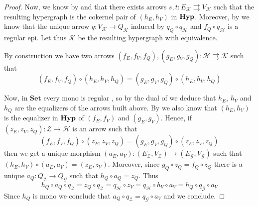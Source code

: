 \documentclass[3p]{elsarticle}
\newcommand{\Set}{\mathbf{Set}}
\newcommand{\catname}[1]{\textbf{\textup{#1}}}
\newcommand{\hyp}{\catname{Hyp}}
\theoremstyle{remark}
\theoremstyle{definition}
\begin{document}
\begin{proof}
	Now, we know by  and  that there exists arrows $s,t\colon E_{\mathcal{K}}\rightrightarrows V_{\mathcal{K}}$ such that the resulting hypergraph is the cokernel pair of $(h_E, h_V)$ in $\hyp$. Moreover, by  we know that the unique arrow $q\colon V_{\mathcal{K}}\to Q_{\mathcal{K}}$
	induced by $q_{Q}\circ q_{\mathcal{H}}$ and $f_{Q}\circ q_{\mathcal{H}}$ is a regular epi. Let thus $\mathcal{K}$ be the resulting hypergraph with equivalence.
	
	
	By construction we have two arrows 	$(f_E, f_V, f_Q), (g_E, g_V, g_Q): \mathcal{H\rightrightarrows K}$ such that 
	\[(f_E, f_V, f_Q)\circ (h_E, h_V, h_Q) =(g_E, g_V, g_Q)\circ (h_E, h_V, h_Q)\]
	
	Now, in $\Set$ every mono is regular \cite{maclane2012sheaves}, so by the dual of  we deduce that $h_E$, $h_V$ and $h_Q$ are the equalizers of the arrows built above. By  we also know that $(h_E, h_V)$ is the equalizer in $\hyp$ of $(f_E, f_V)$ and $(g_E, g_V)$.  Hence, if $(z_E, z_V, z_Q)\colon \mathcal{Z}\to \mathcal{H}$ is an arrow such that 
			\[(f_E, f_V, f_Q)\circ (z_E, z_V, z_Q) =(g_E, g_V, g_Q)\circ (z_E, z_V, z_Q)\]
	then we get a unique morphism $(a_E, a_V)\colon (E_{\mathcal{Z}}, V_{\mathcal{Z}})\to (E_{\mathcal{G}}, V_{\mathcal{G}})$ such that $(h_E, h_V)\circ (a_E, a_V) =(z_E, z_V)$. Moreover, since $g_Q\circ z_Q=f_Q\circ z_Q$ there is a unique $a_Q\colon Q_{\mathcal{Z}}\to Q_\mathcal{G}$ such that $h_Q\circ a_Q=z_Q$. Thus
	\[h_Q\circ a_Q\circ q_{\mathcal{Z}}=z_Q\circ q_{\mathcal{Z}}=q_{\mathcal{H}}\circ z_{V}=q_{\mathcal{H}}\circ h_V\circ a_V=h_Q\circ q_{\mathcal{G}}\circ a_V\]
	Since $h_Q$ is mono we conclude that $a_Q\circ q_{\mathcal{Z}}=q_{\mathcal{G}}\circ a_V$ and we conclude.
\end{proof}
\end{document}
